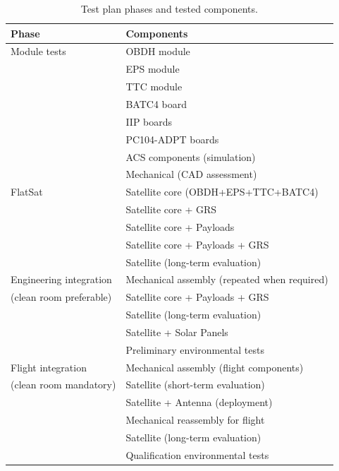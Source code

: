 \begin{table}[!h]
    \begin{center}
        \begin{tabular}{ll}
            \toprule[1.5pt]
            \textbf{Phase}    & \textbf{Components}       \\
            \midrule
            Module tests             & OBDH module \\
                                     & EPS module \\
                                     & TTC module \\
                                     & BATC4 board \\
                                     & IIP boards \\
                                     & PC104-ADPT boards \\
                                     & ACS components (simulation) \\
                                     & Mechanical (CAD assessment) \\
            \midrule
            FlatSat                  & Satellite core (OBDH+EPS+TTC+BATC4) \\
                                     & Satellite core + GRS \\
                                     & Satellite core + Payloads \\
                                     & Satellite core + Payloads + GRS \\
                                     & Satellite (long-term evaluation) \\
            \midrule
            Engineering integration  & Mechanical assembly (repeated when required) \\
            (clean room preferable)  & Satellite core + Payloads + GRS \\
                                     & Satellite (long-term evaluation) \\
                                     & Satellite + Solar Panels \\
                                     & Preliminary environmental tests \\ 
            \midrule
            Flight integration       & Mechanical assembly (flight components) \\
            (clean room mandatory)   & Satellite (short-term evaluation) \\
                                     & Satellite + Antenna (deployment) \\
                                     & Mechanical reassembly for flight \\
                                     & Satellite (long-term evaluation) \\
                                     & Qualification environmental tests \\ 
            \bottomrule[1.5pt]
        \end{tabular}
        \caption{Test plan phases and tested components.}
        \label{tab:test-plan}
    \end{center}
\end{table}


